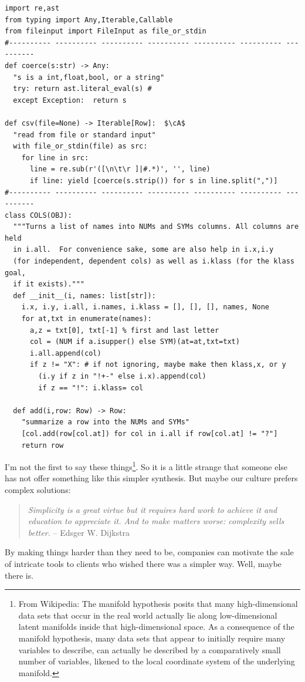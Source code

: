 \documentclass[landscape,	DIV=calc,%
							paper=letter,%
							fontsize=10pt,%
							twocolumn]{scrartcl}	 					%
\newcommand*\circled[1]{\tikz[baseline=(char.base)]{
            \node[minimum width=1pt, shape=circle,fill=black,inner sep=1pt] (char) {{\footnotesize \textcolor{white}{#1}}};}}
\newcommand{\cA}{\circled{a}}
\begin{document}
\begin{table}[!t]
    \begin{lstlisting}
import re,ast
from typing import Any,Iterable,Callable
from fileinput import FileInput as file_or_stdin
#---------- ---------- ---------- ---------- ---------- ---------- ----------
def coerce(s:str) -> Any:
  "s is a int,float,bool, or a string"
  try: return ast.literal_eval(s) # 
  except Exception:  return s

def csv(file=None) -> Iterable[Row]:  $\cA$
  "read from file or standard input"
  with file_or_stdin(file) as src: 
    for line in src:
      line = re.sub(r'([\n\t\r ]|#.*)', '', line)
      if line: yield [coerce(s.strip()) for s in line.split(",")]
#---------- ---------- ---------- ---------- ---------- ---------- ----------
class COLS(OBJ): 
  """Turns a list of names into NUMs and SYMs columns. All columns are held 
  in i.all.  For convenience sake, some are also help in i.x,i.y 
  (for independent, dependent cols) as well as i.klass (for the klass goal, 
  if it exists)."""
  def __init__(i, names: list[str]): 
    i.x, i.y, i.all, i.names, i.klass = [], [], [], names, None
    for at,txt in enumerate(names):
      a,z = txt[0], txt[-1] % first and last letter
      col = (NUM if a.isupper() else SYM)(at=at,txt=txt)
      i.all.append(col)
      if z != "X": # if not ignoring, maybe make then klass,x, or y
        (i.y if z in "!+-" else i.x).append(col)
        if z == "!": i.klass= col

  def add(i,row: Row) -> Row: 
    "summarize a row into the NUMs and SYMs"
    [col.add(row[col.at]) for col in i.all if row[col.at] != "?"]
    return row
\end{lstlisting}
    \caption{Creating rows and column headers (from row1).}\label{read}
\end{table}

I'm not the first to say these things\footnote{
From Wikipedia: The manifold hypothesis posits that many
high-dimensional data sets that occur in the real world actually
lie along low-dimensional latent manifolds inside that high-dimensional
space. As a consequence of the manifold hypothesis, many data sets
that appear to initially require many variables to describe, can
actually be described by a comparatively small number of variables,
likened to the local coordinate system of the underlying manifold.}.
So it is a little
strange that someone else has not offer something like this simpler
synthesis. But maybe our culture prefers complex solutions:

\begin{quote}{\em Simplicity is a great virtue but it requires hard work to achieve
it and education to appreciate it. And to make matters worse:
complexity sells better.}\newline
-- Edsger W. Dijkstra
\end{quote}

By making things harder than they need to be, companies can motivate
the sale  of intricate tools to clients who wished there was a
simpler way. Well, maybe there is.


\clearpage
{}

\end{document}
